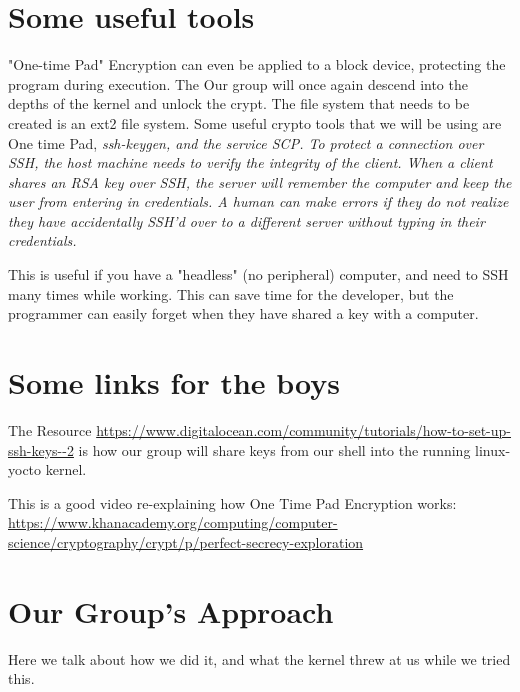 \documentclass[onecolumn, draftclsnofoot,10pt, compsoc]{IEEEtran}
\begin{document}
	\section{ Some useful tools}	
	"One-time Pad" Encryption can even be applied to a block device, protecting the program during execution.
	The  Our group will once again descend into the depths of the kernel and unlock the crypt.
	The file system that needs to be created is an ext2 file system. Some useful crypto tools that we will be using are One time Pad, \it{ssh-keygen}, and the service \it{SCP}. To protect a connection over SSH, the host machine needs to verify the integrity of the client. 
	When a client shares an RSA key over SSH, the server will remember the computer and keep the user from entering in credentials.
	A human can make errors if they do not realize they have accidentally SSH'd over to a different server without typing in their credentials. 

	This is useful if you have a "headless" (no peripheral) computer, and need to SSH many times while working. This can save time for the developer, but the programmer can easily forget when they have shared a key with a computer.
	\section{ Some links for the boys }
	The Resource \url{https://www.digitalocean.com/community/tutorials/how-to-set-up-ssh-keys--2} is how our group will share keys from our shell into the running linux-yocto kernel.

	

    This is a good video re-explaining how One Time Pad Encryption works: \url{ https://www.khanacademy.org/computing/computer-science/cryptography/crypt/p/perfect-secrecy-exploration}


	\section{ Our Group's Approach }
	Here we talk about how we did it, and what the kernel threw at us while we tried this.
        
\end{document}
